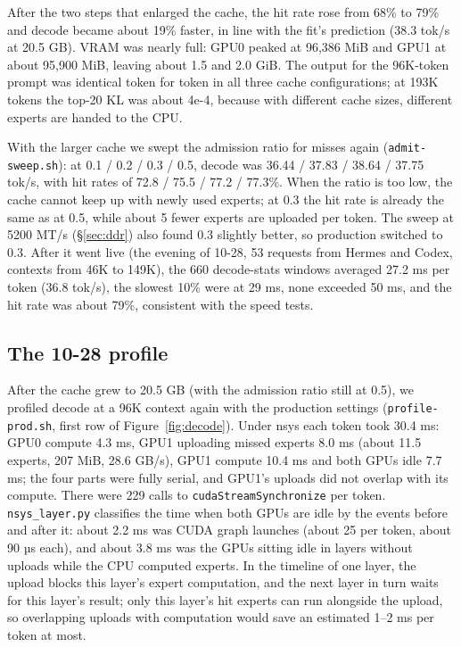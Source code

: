 \documentclass[11pt,a4paper]{article}
\newcommand{\code}[1]{\texttt{#1}}
\newcommand{\tps}{tok/s}
\begin{document}
After the two steps that enlarged the cache, the hit rate rose from 68\% to 79\% and decode became about 19\% faster, in line with the fit's prediction (38.3 \tps{} at 20.5 GB). VRAM was nearly full: GPU0 peaked at 96,386 MiB and GPU1 at about 95,900 MiB, leaving about 1.5 and 2.0 GiB. The output for the 96K-token prompt was identical token for token in all three cache configurations; at 193K tokens the top-20 KL was about 4e-4, because with different cache sizes, different experts are handed to the CPU.

With the larger cache we swept the admission ratio for misses again (\code{admit-sweep.sh}): at 0.1 / 0.2 / 0.3 / 0.5, decode was 36.44 / 37.83 / 38.64 / 37.75 \tps{}, with hit rates of 72.8 / 75.5 / 77.2 / 77.3\%. When the ratio is too low, the cache cannot keep up with newly used experts; at 0.3 the hit rate is already the same as at 0.5, while about 5 fewer experts are uploaded per token. The sweep at 5200 MT/s (\S\ref{sec:ddr}) also found 0.3 slightly better, so production switched to 0.3. After it went live (the evening of 10-28, 53 requests from Hermes and Codex, contexts from 46K to 149K), the 660 decode-stats windows averaged 27.2 ms per token (36.8 \tps{}), the slowest 10\% were at 29 ms, none exceeded 50 ms, and the hit rate was about 79\%, consistent with the speed tests.

\subsection{The 10-28 profile}
\label{sec:remaining}

After the cache grew to 20.5 GB (with the admission ratio still at 0.5), we profiled decode at a 96K context again with the production settings (\code{profile-prod.sh}, first row of Figure~\ref{fig:decode}). Under nsys each token took 30.4 ms: GPU0 compute 4.3 ms, GPU1 uploading missed experts 8.0 ms (about 11.5 experts, 207 MiB, 28.6 GB/s), GPU1 compute 10.4 ms and both GPUs idle 7.7 ms; the four parts were fully serial, and GPU1's uploads did not overlap with its compute. There were 229 calls to \code{cudaStreamSynchronize} per token. \code{nsys\_layer.py} classifies the time when both GPUs are idle by the events before and after it: about 2.2 ms was CUDA graph launches (about 25 per token, about 90 µs each), and about 3.8 ms was the GPUs sitting idle in layers without uploads while the CPU computed experts. In the timeline of one layer, the upload blocks this layer's expert computation, and the next layer in turn waits for this layer's result; only this layer's hit experts can run alongside the upload, so overlapping uploads with computation would save an estimated 1--2 ms per token at most.
\end{document}
